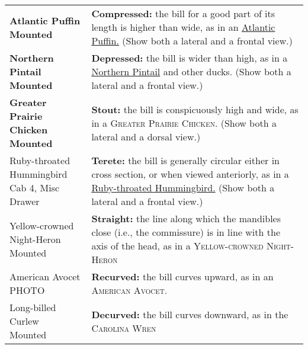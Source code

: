 \documentclass[10pt]{article}
\newif\ifprintkey
\newcommand{\PrintKey}[1]{\ifprintkey{\textbf{#1}}\fi}
\begin{document}
\begin{longtable}{@{}C{0.45\textwidth}L{0.45\textwidth}@{}}
\PrintKey{\textbf{Atlantic Puffin \newline Mounted}} & 
\textbf{Compressed:} the bill for a good part of its length is higher than wide, as in an %
\href{https://www.allaboutbirds.org/guide/Atlantic_Puffin}{Atlantic Puffin.} (Show both a lateral and a frontal view.)\\ [2.5cm]
%
\PrintKey{\textbf{Northern Pintail \newline Mounted}}& 
\textbf{Depressed:} the bill is wider than high, as in a \href{https://www.allaboutbirds.org/guide/Northern_Pintail}{Northern Pintail} and other ducks. (Show both a lateral and a frontal view.)\\ [2.5cm]
%
\PrintKey{\textbf{Greater Prairie Chicken \newline Mounted}} & 
\textbf{Stout:} the bill is conspicuously high and wide, as in a \textsc{Greater Prairie Chicken.} %
(Show both a lateral and a dorsal view.)\\ [2.5cm]
%
\PrintKey{Ruby-throated Hummingbird \newline Cab 4, Misc Drawer} & 
\textbf{Terete:} the bill is generally circular either in cross section, or when viewed anteriorly, as in a \href{https://www.allaboutbirds.org/guide/Ruby-throated_Hummingbird}{Ruby-throated Hummingbird.} (Show both a lateral and a frontal view.)\\ [2.5cm]
%
\PrintKey{Yellow-crowned Night-Heron \newline Mounted}%
& \textbf{Straight:} the line along which the mandibles close (i.e., the commissure) is in line with the axis of the head, as in a \textsc{Yellow-crowned Night-Heron} %
\\ [2.5cm]
%
\PrintKey{American Avocet \newline PHOTO} %
& \textbf{Recurved:} the bill curves upward, as in an \textsc{American Avocet.} %
\\ [2.5cm]
%
\PrintKey{Long-billed Curlew \newline Mounted} & 
\textbf{Decurved:} the bill curves downward, as in the \textsc{Carolina Wren} %

\end{longtable}
\end{document}
